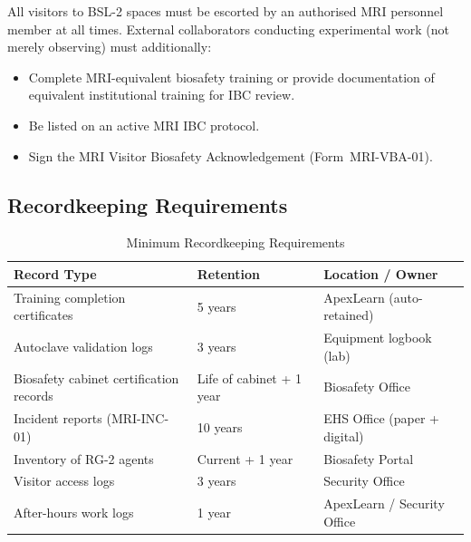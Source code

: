 All visitors to BSL-2 spaces must be escorted by an authorised MRI personnel member
at all times. External collaborators conducting experimental work (not merely
observing) must additionally:

\begin{itemize}[leftmargin=1.6em, itemsep=2pt]
  \item Complete MRI-equivalent biosafety training or provide documentation of
        equivalent institutional training for IBC review.
  \item Be listed on an active MRI IBC protocol.
  \item Sign the MRI Visitor Biosafety Acknowledgement (Form~MRI-VBA-01).
\end{itemize}

\subsection{Recordkeeping Requirements}

\begin{table}[H]
\centering
\caption{Minimum Recordkeeping Requirements}
\label{tab:records}
\footnotesize\sffamily
\begin{tabularx}{\linewidth}{@{} L{4.8cm} C{2.2cm} X @{}}
\toprule
{}
\color{white}\textbf{Record Type} &
\color{white}\textbf{Retention} &
\color{white}\textbf{Location / Owner} \\
\midrule
Training completion certificates & 5 years & ApexLearn (auto-retained) \\
Autoclave validation logs & 3 years & Equipment logbook (lab) \\
Biosafety cabinet certification records & Life of cabinet + 1 year & Biosafety Office \\
Incident reports (MRI-INC-01) & 10 years & EHS Office (paper + digital) \\
Inventory of RG-2 agents & Current + 1 year & Biosafety Portal \\
Visitor access logs & 3 years & Security Office \\
After-hours work logs & 1 year & ApexLearn / Security Office \\
\bottomrule
\end{tabularx}
\end{table}
